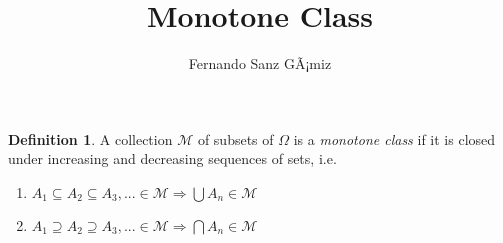 \documentclass[12pt]{article}
\theoremstyle{definition}
\newtheorem*{defn}{Definition}
\theoremstyle{remark}
\numberwithin{equation}{section}
\begin{document}
\title{Monotone Class}%
\author{Fernando Sanz GÃ¡miz}%

\begin{defn}
A collection $\mathcal M$ of subsets of $\Omega$ is a \emph{monotone class}
if it is closed under increasing and decreasing sequences of sets,
i.e.

\begin{enumerate}
\item $A_1 \subseteq A_2 \subseteq A_3 ,...\in \mathcal M \Rightarrow
\bigcup A_n \in \mathcal M$
\item $A_1 \supseteq A_2 \supseteq A_3 ,...\in \mathcal M \Rightarrow
\bigcap A_n \in \mathcal M$
\end{enumerate}

\end{defn}
\end{document}
